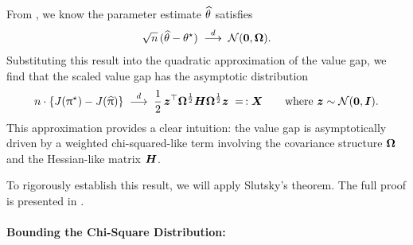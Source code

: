 	From , we know the parameter estimate $ \widehat{\theta} $ satisfies
	\begin{align*}
	\sqrt{n} \, (\widehat{\theta} - \theta^{\star})
	\;\stackrel{d}{\longrightarrow}\;
	\mathcal{N}(\boldsymbol{0}, \boldsymbol{\Omega}).
	\end{align*}
	Substituting this result into the quadratic approximation of the value gap, we find that the scaled value gap has the asymptotic distribution
	\begin{align}
		\label{eq:gap_distr}
		n \cdot \{ J(\uppi^{\star}) - J(\widehat{\uppi}) \}
		 \; \stackrel{d}{\longrightarrow} \; \frac{1}{2} \, \boldsymbol{z}^{\top} \boldsymbol{\Omega}^{\frac{1}{2}} \boldsymbol{H} \boldsymbol{\Omega}^{\frac{1}{2}} \boldsymbol{z} 
		 \; =\,: \boldsymbol{X}
		 \qquad \mbox{where $\boldsymbol{z} \sim \mathcal{N}(\boldsymbol{0}, \boldsymbol{I})$}.
	\end{align}
	This approximation provides a clear intuition: the value gap is asymptotically driven by a weighted chi-squared-like term involving the covariance structure $ \boldsymbol{\Omega} $ and the Hessian-like matrix $ \boldsymbol{H} $.
	
	To rigorously establish this result, we will apply Slutsky’s theorem. The full proof is presented in .
	
	\paragraph{Bounding the Chi-Square Distribution:}
	
